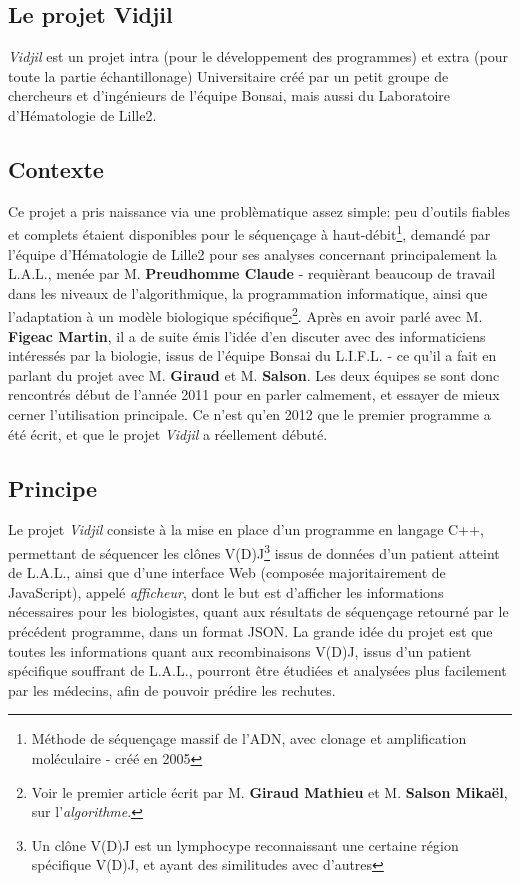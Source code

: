 \documentclass[12pt]{report}
\begin{document}
\begin{spacing}{1.2}
\section{Le projet Vidjil}

\textit{Vidjil} est un projet intra (pour le développement des programmes) et extra (pour toute la partie échantillonage) Universitaire créé par un petit groupe de chercheurs et d'ingénieurs de l'équipe Bonsai, mais aussi du Laboratoire d'Hématologie de Lille2.
\subsection{Contexte}
Ce projet a pris naissance via une problèmatique assez simple: peu d'outils fiables et complets étaient disponibles pour le séquençage à haut-débit\footnote{Méthode de séquençage massif de l'ADN, avec clonage et amplification moléculaire - créé en 2005}, demandé par l'équipe d'Hématologie de Lille2 pour ses analyses concernant principalement la L.A.L., menée par M. \textbf{Preudhomme Claude} - requièrant beaucoup de travail dans les niveaux de l'algorithmique, la programmation informatique, ainsi que l'adaptation à un modèle biologique spécifique\footnote{Voir le premier article écrit par M. \textbf{Giraud Mathieu} et M. \textbf{Salson Mikaël}, sur l'\textit{algorithme}.}.
\newline
Après en avoir parlé avec M. \textbf{Figeac Martin}, il a de suite émis l'idée d'en discuter avec des informaticiens intéressés par la biologie, issus de l'équipe Bonsai du L.I.F.L. - ce qu'il a fait en parlant du projet avec M. \textbf{Giraud} et M. \textbf{Salson}.
\newline
Les deux équipes se sont donc rencontrés début de l'année 2011 pour en parler calmement, et essayer de mieux cerner l'utilisation principale. Ce n'est qu'en 2012 que le premier programme a été écrit, et que le projet \textit{Vidjil} a réellement débuté.

\subsection{Principe}
Le projet \textit{Vidjil} consiste à la mise en place d'un programme en langage C++, permettant de séquencer les clônes V(D)J\footnote{Un clône V(D)J est un lymphocype reconnaissant une certaine région spécifique V(D)J, et ayant des similitudes avec d'autres} issus de données d'un patient atteint de L.A.L., ainsi que d'une interface Web (composée majoritairement de JavaScript), appelé \textit{afficheur}, dont le but est d'afficher les informations nécessaires pour les biologistes, quant aux résultats de séquençage retourné par le précédent programme, dans un format JSON.
\newline
La grande idée du projet est que toutes les informations quant aux recombinaisons V(D)J, issus d'un patient spécifique souffrant de L.A.L., pourront être étudiées et analysées plus facilement par les médecins, afin de pouvoir prédire les rechutes.


\end{spacing}
\end{document}
